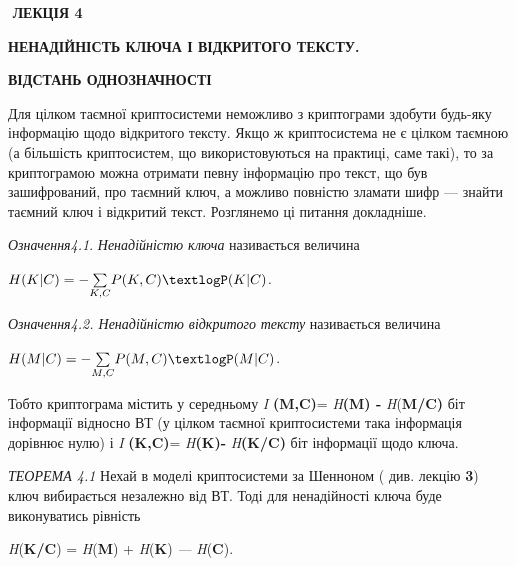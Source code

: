 \bigskip


\bigskip


\bigskip

 $ $\textbf{ ЛЕКЦІЯ  4}


\bigskip

{\centering\bfseries
НЕНАДІЙНІСТЬ  КЛЮЧА  І  ВІДКРИТОГО  ТЕКСТУ.
\par}

{\centering\bfseries
 ВІДСТАНЬ  ОДНОЗНАЧНОСТІ
\par}


\bigskip


\bigskip

Для цілком таємної криптосистеми неможливо з криптограми здобути будь-яку
інформацію щодо відкритого тексту. Якщо ж криптосистема не є цілком таємною (а
більшість криптосистем, що використовуються на практиці, саме такі), то за
криптограмою  можна отримати певну інформацію про текст, що був зашифрований,
про таємний ключ, а можливо повністю зламати шифр --- знайти таємний ключ і
відкритий текст. Розглянемо ці питання докладніше.


\bigskip

\textit{Означення4.1}.  \textit{Ненадійністю ключа }називається  величина 

{\centering
  $H(K|C)=-\underset{K,C}{\sum }{P(K,C)\textlogP(K|C)}$.
\par}

\textit{Означення4.2}\textit{. Ненадійністю відкритого }\textit{тексту}
називається  величина 

{\centering
 $H(M|C)=-\underset{M,C}{\sum }{P(M,C)\textlogP(M|C)}$. $ $
\par}

Тобто  криптограма  містить у середньому \textit{I}\textit{
}\textbf{(}\textbf{M}\textbf{,}\textbf{C}\textbf{)}=\textit{
}\textit{H}\textbf{(}\textbf{M}\textbf{) -
}\textit{H}(\textbf{M}\textbf{/}\textbf{C}\textbf{)}\textbf{  }біт\textbf{
}інформації відносно ВТ (у цілком таємної криптосистеми така інформація
дорівнює нулю) і  \textit{I}\textit{
}\textbf{(}\textbf{K}\textbf{,}\textbf{C}\textbf{)}=\textit{
}\textit{H}\textbf{(}\textbf{K}\textbf{)-}\textit{
}\textit{H}\textbf{(}\textbf{K}\textbf{/}\textbf{C}\textbf{)}\textbf{ }біт
інформації щодо ключа. 

\textit{ТЕОРЕМА 4.1}\textit{  }Нехай в моделі криптосистеми за Шенноном  ( див.
лекцію \textbf{3})  ключ вибирається незалежно від ВТ. Тоді для ненадійності 
ключа буде виконуватись рівність  

{\centering
\textit{H}(\textbf{K}\textbf{/}\textbf{C}) =  \textit{H}(\textbf{M}) +
\textit{H}(\textbf{K}) \textit{--- }\textit{H}(\textbf{C}).
\par}

